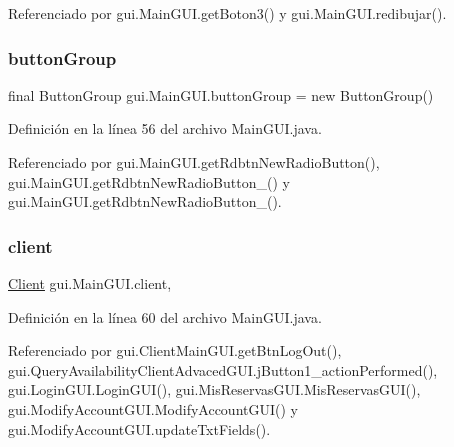 Referenciado por gui.\+Main\+G\+U\+I.\+get\+Boton3() y gui.\+Main\+G\+U\+I.\+redibujar().

\mbox{\label{classgui_1_1_main_g_u_i_a111cafa03ab93711fb6e403de89b9f34}} 
\subsubsection{\texorpdfstring{buttonGroup}{buttonGroup}}
{\footnotesize\ttfamily final Button\+Group gui.\+Main\+G\+U\+I.\+button\+Group = new Button\+Group()\hspace{0.3cm}{\ttfamily [private]}}



Definición en la línea 56 del archivo Main\+G\+U\+I.\+java.



Referenciado por gui.\+Main\+G\+U\+I.\+get\+Rdbtn\+New\+Radio\+Button(), gui.\+Main\+G\+U\+I.\+get\+Rdbtn\+New\+Radio\+Button\+\_() y gui.\+Main\+G\+U\+I.\+get\+Rdbtn\+New\+Radio\+Button\+\_().

\mbox{\label{classgui_1_1_main_g_u_i_ac0f95c6d3d66c5e0077f0497dfe327ad}} 
\subsubsection{\texorpdfstring{client}{client}}
{\footnotesize\ttfamily \mbox{\hyperlink{classdomain_1_1_client}{Client}} gui.\+Main\+G\+U\+I.\+client\hspace{0.3cm}{\ttfamily [static]}, {\ttfamily [protected]}}



Definición en la línea 60 del archivo Main\+G\+U\+I.\+java.



Referenciado por gui.\+Client\+Main\+G\+U\+I.\+get\+Btn\+Log\+Out(), gui.\+Query\+Availability\+Client\+Advaced\+G\+U\+I.\+j\+Button1\+\_\+action\+Performed(), gui.\+Login\+G\+U\+I.\+Login\+G\+U\+I(), gui.\+Mis\+Reservas\+G\+U\+I.\+Mis\+Reservas\+G\+U\+I(), gui.\+Modify\+Account\+G\+U\+I.\+Modify\+Account\+G\+U\+I() y gui.\+Modify\+Account\+G\+U\+I.\+update\+Txt\+Fields().

\mbox{\label{classgui_1_1_main_g_u_i_a27d911b7abcbb68661bbd3388cabcab0}} 
